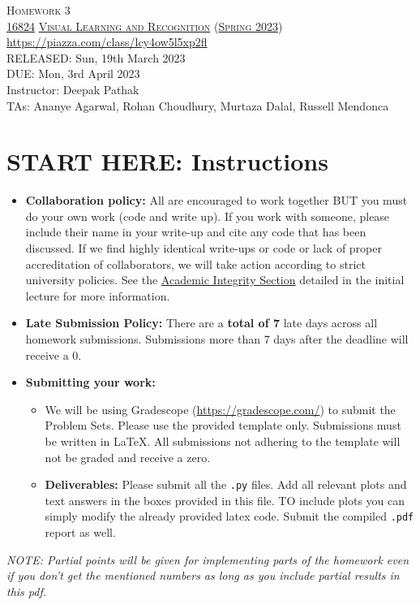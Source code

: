 \documentclass[11pt,addpoints,answers]{exam}
\title{\textsc{\hwName}} %
\author{}
\date{}
\date{}
\numberwithin{equation}{section} %
\numberwithin{figure}{section} %
\numberwithin{table}{section} %
\newcommand{\courseNum}{\href{https://visual-learning.cs.cmu.edu/}{16824}}
\newcommand{\courseName}{\href{https://visual-learning.cs.cmu.edu/}{Visual Learning and Recognition}}
\newcommand{\courseSem}{\href{https://visual-learning.cs.cmu.edu/}{Spring 2023}}
\newcommand{\courseUrl}{\url{https://piazza.com/class/lcy4ow5l5xp2fl}}
\newcommand{\hwNum}{Homework 3}
\newcommand{\hwTopic}{Transformers}
\newcommand{\outDate}{Sun, 19th March 2023}
\newcommand{\dueDate}{Mon, 3rd April 2023}
\newcommand{\instructorName}{Deepak Pathak}
\newcommand{\taNames}{Ananye Agarwal, Rohan Choudhury, Murtaza Dalal, Russell Mendonca}
\begin{document}
\section*{}
\begin{center}
  \textsc{\LARGE \hwNum} \\
  \vspace{1em}
  \textsc{\large \courseNum{} \courseName{} (\courseSem)} \\
  \courseUrl\\
  \vspace{1em}
  RELEASED: \outDate \\
  DUE: \dueDate \\
  Instructor: \instructorName \\
  TAs: \taNames
\end{center}

\section*{START HERE: Instructions}
\begin{itemize}
\item \textbf{Collaboration policy:} All are encouraged to work together BUT you must do your own work (code and write up). If you work with someone, please include their name in your write-up and cite any code that has been discussed. If we find highly identical write-ups or code or lack of proper accreditation of collaborators, we will take action according to strict university policies. See the \href{hhttps://www.cmu.edu/policies/student-and-student-life/academic-integrity.html}{Academic Integrity Section} detailed in the initial lecture for more information.

\item\textbf{Late Submission Policy:} There are a \textbf{total of 7} late days across all homework submissions. Submissions more than 7 days after the deadline will receive a 0.

\item\textbf{Submitting your work:}

\begin{itemize}

\item We will be using Gradescope (\url{https://gradescope.com/}) to submit the Problem Sets. Please use the provided template only. Submissions must be written in LaTeX. All submissions not adhering to the template will not be graded and receive a zero. 
\item \textbf{Deliverables:} Please submit all the \texttt{.py} files. Add all relevant plots and text answers in the boxes provided in this file. TO include plots you can simply modify the already provided latex code. Submit the compiled \texttt{.pdf} report as well.
\end{itemize}
\end{itemize}
\emph{NOTE: Partial points will be given for implementing parts of the homework even if you don't get the mentioned numbers as long as you include partial results in this pdf.}
\clearpage
\end{document}
